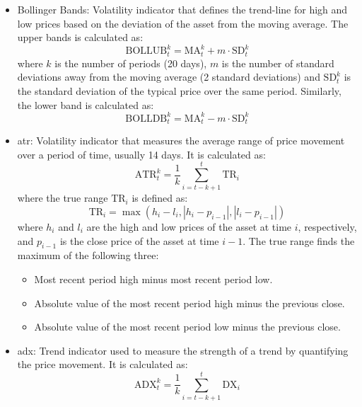 \begin{itemize}
    \item Bollinger Bands: Volatility indicator that defines the trend-line for high and low prices based on the deviation of the asset from the moving average. The upper bands is calculated as:
    \begin{equation}
        \text{BOLLUB}_t^k = \text{MA}_t^k + m \cdot \text{SD}_t^k
    \end{equation}
    where $k$ is the number of periods (20 days), $m$ is the number of standard deviations away from the moving average (2 standard deviations) and $\text{SD}_t^k$ is the standard deviation of the typical price over the same period. Similarly, the lower band is calculated as:
    \begin{equation}
        \text{BOLLDB}_t^k = \text{MA}_t^k - m \cdot \text{SD}_t^k
    \end{equation}
    \item \acrfull{atr}: Volatility indicator that measures the average range of price movement over a period of time, usually 14 days. It is calculated as:
    \begin{equation}
        \text{ATR}_t^k = \frac{1}{k} \sum_{i=t-k+1}^{t} \text{TR}_i
    \end{equation}
    where the true range $\text{TR}_i$ is defined as:
    \begin{equation}
        \text{TR}_i = \max \left( h_i - l_i, \left|h_i - p_{i-1}\right|, \left|l_i - p_{i-1}\right| \right)
    \end{equation}
    where $h_i$ and $l_i$ are the high and low prices of the asset at time $i$, respectively, and $p_{i-1}$ is the close price of the asset at time $i-1$. The true range finds the maximum of the following three: 
    \begin{itemize}
        \item Most recent period high minus most recent period low.
        \item Absolute value of the most recent period high minus the previous close.
        \item Absolute value of the most recent period low minus the previous close.
    \end{itemize}
    \item \acrfull{adx}: Trend indicator used to measure the strength of a trend by quantifying the price movement. It is calculated as:
    \begin{equation}
        \text{ADX}_t^k = \frac{1}{k} \sum_{i=t-k+1}^{t} \text{DX}_i
    \end{equation}

\end{itemize}

